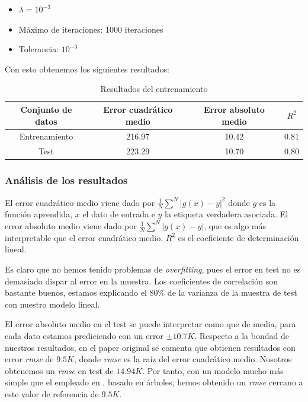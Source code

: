 \documentclass[11pt]{article}
\begin{document}
\begin{itemize}
    \item $\lambda = 10^{-3}$
    \item Máximo de iteraciones: 1000 iteraciones
    \item Tolerancia: $10^{-3}$
\end{itemize}

Con esto obtenemos los siguientes resultados:

\begin{table}[H]
\centering
\begin{tabular}{|c|c|c|c|}
    \hline
    \textbf{Conjunto de datos} & \textbf{Error cuadrático medio} & \textbf{Error absoluto medio} & \textbf{$R^2$} \\
    \hline
    Entrenamiento & 216.97 & 10.42 & 0.81 \\
    Test & 223.29 & 10.70 & 0.80 \\
    \hline
\end{tabular}
    \caption{Resultados del entrenamiento}
\end{table}

\subsubsection{Análisis de los resultados}

El error cuadrático medio viene dado por $\frac{1}{N} \sum^N |g(x) - y|^2$ donde $g$ es la función aprendida, $x$ el dato de entrada e $y$ la etiqueta verdadera asociada. El error absoluto medio viene dado por $\frac{1}{N} \sum^N |g(x) - y|$, que es algo más interpretable que el error cuadrático medio. $R^2$ es el coeficiente de determinación lineal.

Es claro que no hemos tenido problemas de \emph{overfitting}, pues el error en test no es demasiado dispar al error en la muestra. Los coeficientes de correlación son bastante buenos, estamos explicando el $80\%$ de la varianza de la muestra de test con nuestro modelo lineal.

El error absoluto medio en el test se puede interpretar como que de media, para cada dato estamos prediciendo con un error $\pm 10.7 K$. Respecto a la bondad de nuestros resultados, en el paper original \cite{original_paper_reg:paper} se comenta que obtienen resultados con error \emph{rmse} de $9.5K$, donde \emph{rmse} es la raíz del error cuadrático medio. Nosotros obtenemos un \emph{rmse} en test de $14.94K$. Por tanto, con un modelo mucho más simple que el empleado en \cite{original_paper_reg:paper}, basado en árboles, hemos obtenido un \emph{rmse} cercano a este valor de referencia de $9.5K$.
\end{document}
